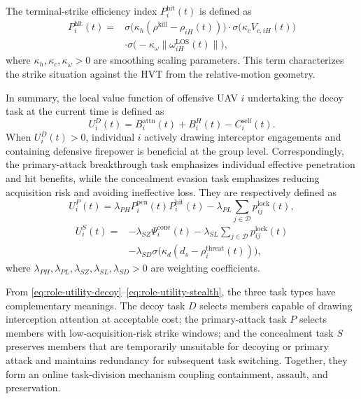 \documentclass{cja}
\begin{document}
The terminal-strike efficiency index $P_i^{\mathrm{hit}}(t)$ is defined as
\begin{equation}
\begin{aligned}
P_i^{\mathrm{hit}}(t)
={}&
\sigma\!\bigl(\kappa_h(\rho^{\mathrm{kill}}-\rho_{iH}(t))\bigr)
\cdot
\sigma\!\bigl(\kappa_c V_{c,iH}(t)\bigr)\\
&\cdot
\sigma\!\bigl(-\kappa_{\omega}\|\omega_{iH}^{\mathrm{LOS}}(t)\|\bigr),
\end{aligned}
\label{eq:P_hit_def}
\end{equation}
where $\kappa_h,\kappa_c,\kappa_{\omega}>0$ are smoothing scaling parameters. This term characterizes the strike situation against the HVT from the relative-motion geometry.

In summary, the local value function of offensive UAV $i$ undertaking the decoy task at the current time is defined as
\begin{equation}
U_i^{D}(t)
=
B_i^{\mathrm{attn}}(t)
+
B_i^{H}(t)
-
C_i^{\mathrm{self}}(t).
\label{eq:role-utility-decoy}
\end{equation}
When $U_i^{D}(t)>0$, individual $i$ actively drawing interceptor engagements and containing defensive firepower is beneficial at the group level.
Correspondingly, the primary-attack breakthrough task emphasizes individual effective penetration and hit benefits, while the concealment evasion task emphasizes reducing acquisition risk and avoiding ineffective loss. They are respectively defined as
\begin{equation}
U_i^{P}(t)
=
\lambda_{PH}P_i^{\mathrm{pen}}(t)P_i^{\mathrm{hit}}(t)
-
\lambda_{PL}\sum_{j\in\mathcal D}p_{ij}^{\mathrm{lock}}(t),
\label{eq:role-utility-pen}
\end{equation}
\begin{equation}
\begin{aligned}
U_i^{S}(t)
={}&
-\lambda_{SZ}\Psi_i^{\mathrm{cone}}(t)
-\lambda_{SL}\sum_{j\in\mathcal D}p_{ij}^{\mathrm{lock}}(t)\\
&-\lambda_{SD}\sigma\!\bigl(\kappa_d(d_s-\rho_i^{\mathrm{threat}}(t))\bigr),
\end{aligned}
\label{eq:role-utility-stealth}
\end{equation}
where $\lambda_{PH},\lambda_{PL},\lambda_{SZ},\lambda_{SL},\lambda_{SD}>0$ are weighting coefficients.

From \eqref{eq:role-utility-decoy}--\eqref{eq:role-utility-stealth}, the three task types have complementary meanings. The decoy task $D$ selects members capable of drawing interception attention at acceptable cost; the primary-attack task $P$ selects members with low-acquisition-risk strike windows; and the concealment task $S$ preserves members that are temporarily unsuitable for decoying or primary attack and maintains redundancy for subsequent task switching. Together, they form an online task-division mechanism coupling containment, assault, and preservation.
\end{document}
